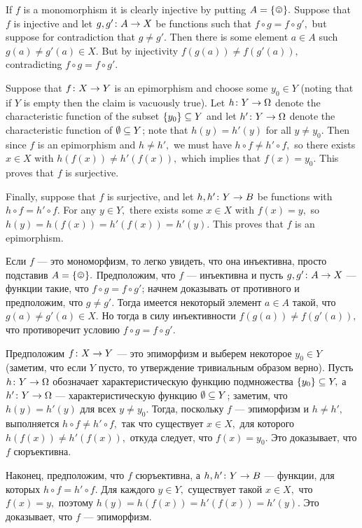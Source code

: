 \documentclass[CT4S-EN-RU]{subfiles}
\begin{document}
\begin{proofENG}
If $f$ is a monomorphism it is clearly injective by putting $A=\singleton.$ Suppose that $f$ is injective and let $g,g'\taking A\to X$ be functions such that $f\circ g=f\circ g',$ but suppose for contradiction that $g\neq g'.$ Then there is some element $a\in A$ such $g(a)\neq g'(a)\in X.$ But by injectivity $f(g(a))\neq f(g'(a)),$ contradicting $f\circ g=f\circ g'.$

Suppose that $f\taking X\to Y$ is an epimorphism and choose some $y_0\in Y$ (noting that if $Y$ is empty then the claim is vacuously true). Let $h\taking Y\to\Omega$ denote the characteristic function of the subset $\{y_0\}\ss Y$ and let $h'\taking Y\to\Omega$ denote the characteristic function of $\emptyset\ss Y$; note that $h(y)=h'(y)$ for all $y\neq y_0.$ Then since $f$ is an epimorphism and $h\neq h',$ we must have $h\circ f\neq h'\circ f,$ so there exists $x\in X$ with $h(f(x))\neq h'(f(x)),$ which implies that $f(x)=y_0.$ This proves that $f$ is surjective.

Finally, suppose that $f$ is surjective, and let $h,h'\taking Y\to B$ be functions with $h\circ f=h'\circ f.$ For any $y\in Y,$ there exists some $x\in X$ with $f(x)=y,$ so $h(y)=h(f(x))=h'(f(x))=h'(y).$ This proves that $f$ is an epimorphism.
\end{proofENG}

\begin{proofRUS}
Если $f$ — это мономорфизм, то легко увидеть, что она инъективна, просто подставив $A=\singleton.$ Предположим, что $f$ — инъективна и пусть $g,g'\taking A\to X$ — функции такие, что $f\circ g=f\circ g'$; начнем доказывать от противного и предположим, что $g\neq g'.$ Тогда имеется некоторый элемент $a\in A$ такой, что $g(a)\neq g'(a)\in X.$ Но тогда в силу инъективности $f(g(a))\neq f(g'(a)),$ что противоречит условию $f\circ g=f\circ g'.$

Предположим $f\taking X\to Y$ — это эпиморфизм и выберем некоторое $y_0\in Y$ (заметим, что если $Y$ пусто, то утверждение тривиальным образом верно). Пусть $h\taking Y\to\Omega$ обозначает характеристическую функцию подмножества $\{y_0\}\ss Y,$ а $h'\taking Y\to\Omega$ — характеристическую функцию $\emptyset\ss Y$; заметим, что $h(y)=h'(y)$ для всех $y\neq y_0.$ Тогда, поскольку $f$ — эпиморфизм и $h\neq h',$ выполняется $h\circ f\neq h'\circ f,$ так что существует $x\in X,$ для которого $h(f(x))\neq h'(f(x)),$ откуда следует, что $f(x)=y_0.$ Это доказывает, что $f$ сюръективна.

Наконец, предположим, что $f$ сюръективна, а $h,h'\taking Y\to B$ — функции, для которых $h\circ f=h'\circ f.$ Для каждого $y\in Y,$ существует такой $x\in X,$ что $f(x)=y,$ поэтому $h(y)=h(f(x))=h'(f(x))=h'(y).$ Это доказывает, что $f$ — эпиморфизм.
\end{proofRUS}
\end{document}
